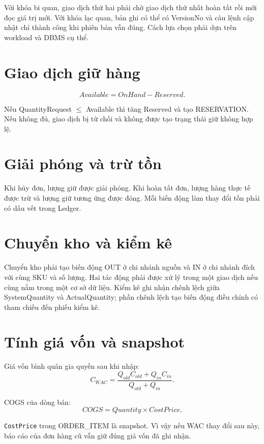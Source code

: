 Với khóa bi quan, giao dịch thứ hai phải chờ giao dịch thứ nhất hoàn tất rồi mới đọc giá trị mới. Với khóa lạc quan, bản ghi có thể có VersionNo và câu lệnh cập nhật chỉ thành công khi phiên bản vẫn đúng. Cách lựa chọn phải dựa trên workload và DBMS cụ thể.

\section{Giao dịch giữ hàng}

\[
Available = OnHand - Reserved.
\]

Nếu QuantityRequest $\leq$ Available thì tăng Reserved và tạo RESERVATION. Nếu không đủ, giao dịch bị từ chối và không được tạo trạng thái giữ không hợp lệ.

\section{Giải phóng và trừ tồn}

Khi hủy đơn, lượng giữ được giải phóng. Khi hoàn tất đơn, lượng hàng thực tế được trừ và lượng giữ tương ứng được đóng. Mỗi biến động làm thay đổi tồn phải có dấu vết trong Ledger.

\section{Chuyển kho và kiểm kê}

Chuyển kho phải tạo biến động OUT ở chi nhánh nguồn và IN ở chi nhánh đích với cùng SKU và số lượng. Hai tác động phải được xử lý trong một giao dịch nếu cùng nằm trong một cơ sở dữ liệu. Kiểm kê ghi nhận chênh lệch giữa SystemQuantity và ActualQuantity; phần chênh lệch tạo biến động điều chỉnh có tham chiếu đến phiếu kiểm kê.

\section{Tính giá vốn và snapshot}

Giá vốn bình quân gia quyền sau khi nhập:
\[
C_{WAC}=\frac{Q_{old}C_{old}+Q_{in}C_{in}}{Q_{old}+Q_{in}}.
\]

COGS của dòng bán:
\[
COGS=Quantity\times CostPrice.
\]

\texttt{CostPrice} trong ORDER\_ITEM là snapshot. Vì vậy nếu WAC thay đổi sau này, báo cáo của đơn hàng cũ vẫn giữ đúng giá vốn đã ghi nhận.
